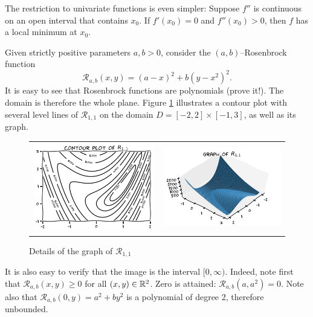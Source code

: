 \begin{remark}
The restriction to univariate functions is even simpler: Suppose $f''$ is continuous on an open interval that contains $x_0$.  If $f'(x_0)=0$ and $f''(x_0)>0$, then $f$ has a local minimum at $x_0$. 
\end{remark}

\begin{example}\label{example:Rosenbrock}
Given strictly positive parameters $a,b > 0$, consider the $(a,b)$--Rosenbrock function 
\begin{equation*} 
\mathcal{R}_{a,b}(x, y) = (a-x)^2 + b(y-x^2)^2.
\end{equation*}
It is easy to see that Rosenbrock functions are polynomials (prove it!).  The domain is therefore the whole plane. Figure \ref{figure:Rosenbrock} illustrates a contour plot with several level lines of $\mathcal{R}_{1,1}$ on the domain $D = [-2,2] \times [-1,3]$, as well as its graph.

\begin{figure}[ht!]
\begin{tabular}{cc}
\includegraphics[width=0.5\linewidth]{rosenbrockContour} &
\includegraphics[width=0.5\linewidth]{rosenbrockGraph}
\end{tabular}
\caption{Details of the graph of $\mathcal{R}_{1,1}$}
\label{figure:Rosenbrock}
\end{figure}
It is also easy to verify that the image is the interval $[0,\infty)$.  Indeed, note first that $\mathcal{R}_{a,b}(x,y) \geq 0$ for all $(x,y) \in \mathbb{R}^2$.  Zero is attained: $\mathcal{R}_{a,b} (a,a^2) = 0$.  Note also that $\mathcal{R}_{a,b}(0,y) = a^2 + by^2$ is a polynomial of degree 2, therefore unbounded.


\end{example}
